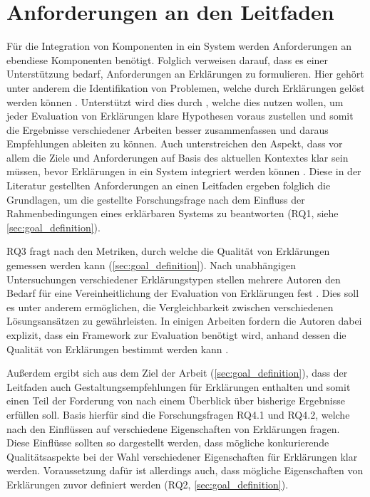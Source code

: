 \section{Anforderungen an den Leitfaden}

Für die Integration von Komponenten in ein System werden Anforderungen an ebendiese Komponenten benötigt. Folglich verweisen \citeauthor{chazette_end-users_nodate, doshi2017towards} darauf, dass es einer Unterstützung bedarf, Anforderungen an Erklärungen zu formulieren. Hier gehört unter anderem die Identifikation von Problemen, welche durch Erklärungen gelöst werden können \cite{chazette_end-users_nodate, doshi2017towards}. Unterstützt wird dies durch \citeauthor{waa_evaluating_2021}, welche dies nutzen wollen, um jeder Evaluation von Erklärungen klare Hypothesen voraus zustellen und somit die Ergebnisse verschiedener Arbeiten besser zusammenfassen und daraus Empfehlungen ableiten zu können. Auch \citeauthor{kohl_explainability_2019} unterstreichen den Aspekt, dass vor allem die Ziele und Anforderungen auf Basis des aktuellen Kontextes klar sein müssen, bevor Erklärungen in ein System integriert werden können \cite{kohl_explainability_2019}. Diese in der Literatur gestellten Anforderungen an einen Leitfaden ergeben folglich die Grundlagen, um die gestellte Forschungsfrage nach dem Einfluss der Rahmenbedingungen eines erklärbaren Systems zu beantworten (RQ1, siehe \autoref{sec:goal_definition}).

RQ3 fragt nach den Metriken, durch welche die Qualität von Erklärungen gemessen werden kann (\autoref{sec:goal_definition}). Nach unabhängigen Untersuchungen verschiedener Erklärungstypen stellen mehrere Autoren den Bedarf für eine Vereinheitlichung der Evaluation von Erklärungen fest \cite{cirqueira_scenario-based_2020,zahedi_towards_2019, nunes_systematic_2017, martin_evaluating_2021}. Dies soll es unter anderem ermöglichen, die Vergleichbarkeit zwischen verschiedenen Lösungsansätzen zu gewährleisten. In einigen Arbeiten fordern die Autoren dabei explizit, dass ein Framework zur Evaluation benötigt wird, anhand dessen die Qualität von Erklärungen bestimmt werden kann \cite{nunes_systematic_2017,sokol_explainability_2020,chari_explanation_2020}.

Außerdem ergibt sich aus dem Ziel der Arbeit (\autoref{sec:goal_definition}), dass der Leitfaden auch Gestaltungsempfehlungen für Erklärungen enthalten und somit einen Teil der Forderung von \citeauthor{waa_evaluating_2021} nach einem Überblick über bisherige Ergebnisse erfüllen soll. Basis hierfür sind die Forschungsfragen RQ4.1 und RQ4.2, welche nach den Einflüssen auf verschiedene Eigenschaften von Erklärungen fragen. Diese Einflüsse sollten so dargestellt werden, dass mögliche konkurierende Qualitätsaspekte bei der Wahl verschiedener Eigenschaften für Erklärungen klar werden. Voraussetzung dafür ist allerdings auch, dass mögliche Eigenschaften von Erklärungen zuvor definiert werden (RQ2, \autoref{sec:goal_definition}).

